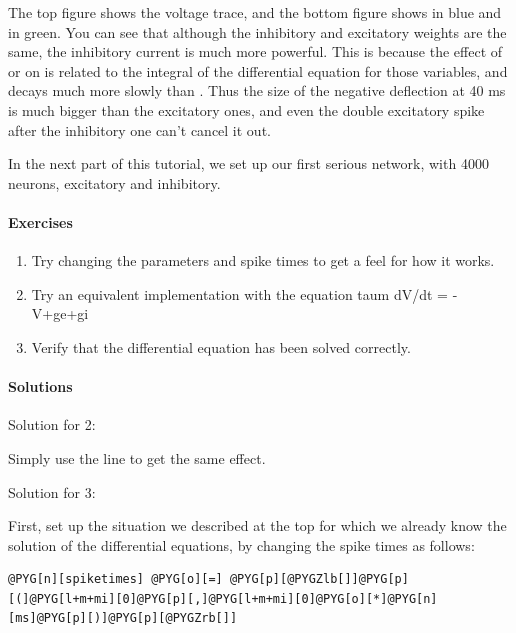 \documentclass[letterpaper,10pt,english]{manual}
\begin{document}
The top figure shows the voltage trace, and the bottom figure shows  in
blue and  in green. You can see that although the inhibitory and
excitatory weights are the same, the inhibitory current is much more
powerful. This is because the effect of  or  on  is related to the
integral of the differential equation for those variables, and  decays
much more slowly than . Thus the size of the negative deflection at
40 ms is much bigger than the excitatory ones, and even the double
excitatory spike after the inhibitory one can't cancel it out.

In the next part of this tutorial, we set up our first serious network,
with 4000 neurons, excitatory and inhibitory.


\paragraph{Exercises}
\begin{enumerate}
\item {} 
Try changing the parameters and spike times to get a feel for how it
works.

\item {} 
Try an equivalent implementation with the equation taum dV/dt = -V+ge+gi

\item {} 
Verify that the differential equation has been solved correctly.

\end{enumerate}


\paragraph{Solutions}

Solution for 2:

Simply use the line  to get the same effect.

Solution for 3:

First, set up the situation we described at the top for which we
already know the solution of the differential equations, by changing
the spike times as follows:

\begin{Verbatim}[commandchars=@\[\]]
@PYG[n][spiketimes] @PYG[o][=] @PYG[p][@PYGZlb[]]@PYG[p][(]@PYG[l+m+mi][0]@PYG[p][,]@PYG[l+m+mi][0]@PYG[o][*]@PYG[n][ms]@PYG[p][)]@PYG[p][@PYGZrb[]]
\end{Verbatim}
\end{document}

